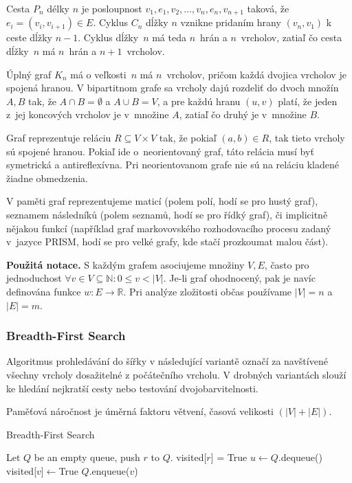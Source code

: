 Cesta $P_n$ délky $n$ je posloupnost $v_1,e_1,v_2,\ldots,v_n,e_n,v_{n+1}$ 
taková, že $e_i = (v_i, v_{i+1}) \in E$. Cyklus $C_n$ dĺžky $n$ vznikne
pridaním hrany $(v_n, v_1)$ k ceste dĺžky $n-1$. Cyklus dĺžky~$n$ má 
teda $n$~hrán a $n$~vrcholov, zatiaľ čo cesta dĺžky~$n$ má $n$~hrán a $n+1$~vrcholov.

Úplný graf $K_n$ má o veľkosti~$n$ má $n$~vrcholov, pričom každá dvojica
vrcholov je spojená hranou. V bipartitnom grafe sa vrcholy dajú
rozdeliť do dvoch množín $A,B$ tak, že $A \cap B = \emptyset$ a 
$A \cup B = V$, a pre každú hranu $(u,v)$ platí, že jeden z~jej
koncových vrcholov je v~množine $A$, zatiaľ čo druhý je v~množine $B$.

Graf reprezentuje reláciu $R \subseteq V \times V$ tak, že pokiaľ
$(a,b) \in R$, tak tieto vrcholy sú spojené hranou. Pokiaľ ide 
o~neorientovaný graf, táto relácia musí byť symetrická a antireflexívna.
Pri neorientovanom grafe nie sú na reláciu kladené žiadne obmedzenia.

V paměti graf reprezentujeme maticí (polem polí, hodí se pro hustý
graf), seznamem následníků (polem seznamů, hodí se pro řídký graf), či
implicitně nějakou funkcí (například graf markovovského rozhodovacího
procesu zadaný v~jazyce PRISM, hodí se pro velké grafy, kde stačí
prozkoumat malou část).

\bigskip
\noindent
\textbf{Použitá notace.} S každým grafem asociujeme množiny $V, E$,
často pro jednoduchost
$\forall v \in V \subseteq \mathbb{N} : 0 \leq v < \lvert V \rvert$.
Je-li graf ohodnocený, pak je navíc definována funkce $w : E \to
\mathbb{R}$. Pri analýze zložitosti občas používame $|V|=n$ a $|E|=m$.

\subsubsection*{Breadth-First Search}

Algoritmus prohledávání do šířky v následující variantě označí za
navštívené všechny vrcholy dosažitelné z počátečního vrcholu. V drobných
variantách slouží ke hledání nejkratší cesty nebo testování
dvojobarvitelnosti.

Paměťová náročnost je úměrná faktoru větvení, časová velikosti
$(\lvert V \rvert + \lvert E \rvert)$.

\begin{algorithm}
\caption{Breadth-First Search}
\begin{algorithmic}[1]
    \State Let $Q$ be an empty queue, push $r$ to $Q$.
    \State visited[$r$] = True
        \State $u \gets Q$.dequeue()
                \State visited[$v$]$ \gets $True
                \State $Q$.enqueue($v$)
            \EndIf
        \EndFor
    \EndWhile
\EndFunction
\end{algorithmic}
\end{algorithm}

